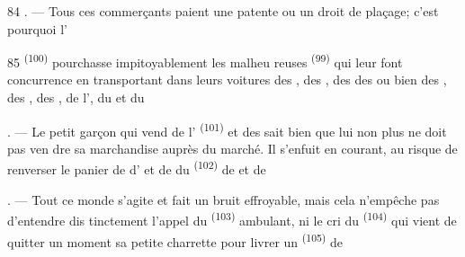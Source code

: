 \begin{VUpage}[86]{84}
. --- Tous ces commerçants paient une patente\nl
ou un droit de plaçage; c'est pourquoi l'
\parplein
\end{VUpage}

\begin{VUpage}[87]{85}
\VUcontinue
{} \textsuperscript{(100)} pourchasse impitoyablement les malheu\cc
reuses  \textsuperscript{(99)} qui\nl
leur font concurrence en transportant dans leurs\nl
voitures des , des , des \nl
des  ou bien des , des\nl
{}, des , de l', du \nl
et du 

. --- Le petit garçon qui vend de l' \textsuperscript{(101)} et des\nl
{} sait bien que lui non plus ne doit pas ven\cc
dre sa marchandise auprès du marché. Il s'enfuit en\nl
courant, au risque de renverser le panier de \nl
d' et de  du  \textsuperscript{(102)}\nl
de  et de 

. --- Tout ce monde s'agite et fait un bruit\nl
effroyable, mais cela n'empêche pas d'entendre dis\cc
tinctement l'appel du  \textsuperscript{(103)} ambulant, ni le cri\nl
du  \textsuperscript{(104)} qui vient de quitter un moment\nl
sa petite charrette pour livrer un  \textsuperscript{(105)} de 

\VUsaut{6.0mm}
\VUfilet{22mm}
\end{VUpage}
